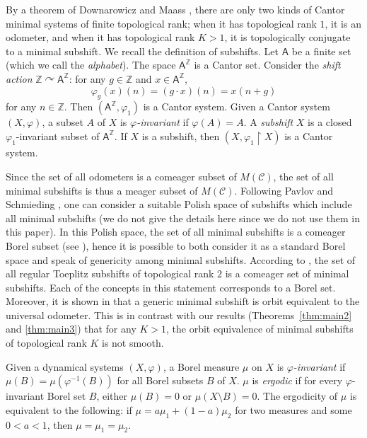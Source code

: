 \documentclass{amsart}
\theoremstyle{definition}
\theoremstyle{problem}
\theoremstyle{remark}
\numberwithin{equation}{section}
\newcommand{\orb}{\mbox{\rm orbit}}
\begin{document}
By a theorem of Downarowicz and Maass \cite{DM}, there are only two kinds of Cantor minimal systems of finite topological rank; when it has topological rank $1$, it is an odometer, and when it has topological rank $K>1$, it is topologically conjugate to a minimal subshift. We recall the definition of subshifts. Let $\mathsf{A}$ be a finite set (which we call the {\em alphabet}). The space $\mathsf{A}^\mathbb{Z}$ is a Cantor set. Consider the {\em shift action} $\mathbb{Z}\curvearrowright \mathsf{A}^\mathbb{Z}$: for any $g\in \mathbb{Z}$ and $x\in \mathsf{A}^\mathbb{Z}$,
$$ \varphi_g(x)(n)=(g\cdot x)(n)=x(n+g) $$
for any $n\in\mathbb{Z}$. Then $(\mathsf{A}^\mathbb{Z}, \varphi_1)$ is a Cantor system. Given a Cantor system $(X, \varphi)$, a subset $A$ of $X$ is {\em $\varphi$-invariant} if $\varphi(A)=A$. A {\em subshift} $X$ is a closed $\varphi_1$-invariant subset of $\mathsf{A}^\mathbb{Z}$. If $X$ is a subshift, then $(X, \varphi_1\upharpoonright X)$ is a Cantor system. %

Since the set of all odometers is a comeager subset of $M(\mathcal{C})$, the set of all minimal subshifts is thus a meager subset of $M(\mathcal{C})$. Following Pavlov and Schmieding \cite{PS}, one can consider a suitable Polish space of subshifts which include all minimal subshifts (we do not give the details here since we do not use them in this paper). In this Polish space, the set of all minimal subshifts is a comeager Borel subset (see \cite[Theorem 1.3]{PS}), hence it is possible to both consider it as a standard Borel space and speak of genericity among minimal subshifts. According to \cite[Theorem 1.3]{PS}, the set of all regular Toeplitz subshifts of topological rank $2$ is a comeager set of minimal subshifts. Each of the concepts in this statement corresponds to a Borel set. Moreover, it is shown in \cite[Theorem 1.3]{PS} that a generic minimal subshift is orbit equivalent to the universal odometer. This is in contrast with our results (Theorems~\ref{thm:main2} and \ref{thm:main3}) that for any $K>1$, the orbit equivalence of minimal subshifts of topological rank $K$ is not smooth.

Given a dynamical systems $(X, \varphi)$,  a Borel measure $\mu$ on $X$  is {\em $\varphi$-invariant} if $\mu(B) =\mu(\varphi^{-1}(B))$ for all Borel subsets $B$ of $X$. $\mu$ is {\em ergodic} if for every $\varphi$-invariant Borel set $B $, either $\mu(B)=0$ or $\mu(X\setminus B)=0$.  The  ergodicity of $\mu$ is equivalent to the following: if $\mu=a\mu_1+(1-a)\mu_2$  for two measures and some $0<a<1$, then $\mu=\mu_1=\mu_2$. 
\end{document}
